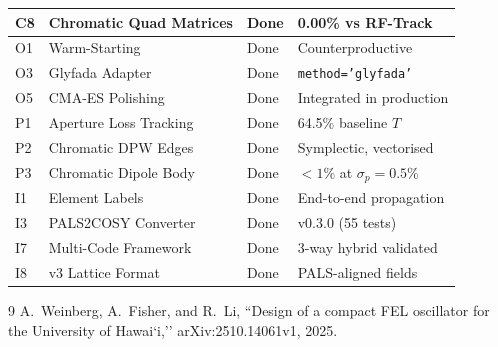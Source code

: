 \documentclass[11pt]{article}
\begin{document}
\begin{longtable}{@{} l l l l @{}}
C8 & Chromatic Quad Matrices & Done & 0.00\% vs RF-Track \\
\midrule
O1 & Warm-Starting & Done & Counterproductive \\
O3 & Glyfada Adapter & Done & \texttt{method='glyfada'} \\
O5 & CMA-ES Polishing & Done & Integrated in production \\
\midrule
P1 & Aperture Loss Tracking & Done & 64.5\% baseline $T$ \\
P2 & Chromatic DPW Edges & Done & Symplectic, vectorised \\
P3 & Chromatic Dipole Body & Done & $< 1\%$ at $\sigma_p = 0.5\%$ \\
\midrule
I1 & Element Labels & Done & End-to-end propagation \\
I3 & PALS2COSY Converter & Done & v0.3.0 (55 tests) \\
I7 & Multi-Code Framework & Done & 3-way hybrid validated \\
I8 & v3 Lattice Format & Done & PALS-aligned fields \\
\end{longtable}
\normalsize


\begin{thebibliography}{9}
  A.~Weinberg, A.~Fisher, and R.~Li,
  ``Design of a compact FEL oscillator for the University of Hawai`i,''
  arXiv:2510.14061v1, 2025.
\end{thebibliography}
\end{document}

